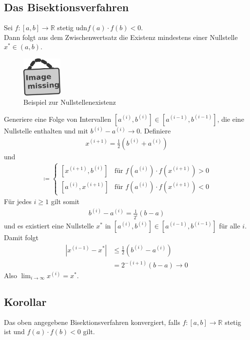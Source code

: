 \documentclass[ngerman,fontsize=11pt, paper=a4, parskip=half, titlepage=true, toc=bib]{scrbook}
\newcommand{\R}{\mathds{R}}
\newcommand{\imagemissing}[1]{
	\begin{figure}
		\centering
		\includegraphics[width=2cm]{images/image_missing.jpg}
		\caption{#1}
	\end{figure}
}
\begin{document}
	  \subsection{Das Bisektionsverfahren}
	  Sei $f:[a,b]\rightarrow \R $ stetig udn$f(a) \cdot f(b) <0$.\\
	  Dann folgt aus dem Zwischenwertsatz die Existenz
	  mindestens einer Nullstelle $x^{*}\in (a,b)$.
	  
	  \imagemissing{Beispiel zur Nullstellenexistenz}
	  
	  Generiere eine Folge von Intervallen
	  $[a^{(i)}, b^{(i)}]\in  [a^{(i-1)}, b^{(i-1)}] $,
	  die eine Nullstelle enthalten und mit $b^{(i)}-a^{(i)} \longrightarrow 0$.
	  Definiere
	  \begin{gather}
	  	x^{(i+1)}= \frac{1}{2}(b^{(i)}+a^{(i)})
	  	\label{V.1.1}
	  \end{gather}
	  und
	  \begin{gather}
	  	[a^{(i+1)}, b^{(i+1)}] \coloneqq \begin{cases}
	  		 [x^{(i+1)}, b^{(i)}] & \text{für } f(a^{(i)})\cdot f(x^{(i+1)}) > 0 \\
	  		 [a^{(i)}, x^{(i+1)}] & \text{für } f(a^{(i)})\cdot f(x^{(i+1)}) < 0
	  	\end{cases}
	  	\label{V.1.2}
	  \end{gather}
	  Für jedes $i\geq 1$ gilt somit
	  \begin{gather*}
	  	b^{(i)}-a^{(i)} = \frac{1}{2^i}(b-a)
	  \end{gather*}
	  und es existiert eine Nullstelle $x^{*}$ in $[a^{(i)}, b^{(i)}]\in  [a^{(i-1)}, b^{(i-1)}] $
	  für alle $i$. \\
	  Damit folgt
	  \begin{align*}
	  	|x^{(i-1)}-x^{*}| &\leq \frac{1}{2}(b^{(i)}-a^{(i)}) \\
	  								&=  2^{-(i+1)} (b-a) \longrightarrow 0
	  \end{align*}
	  Also $\lim_{i\rightarrow \infty}x^{(i)} = x^{*}$.
	  
	  
	\subsection{Korollar}
	Das oben angegebene Bisektionsverfahren konvergiert, falls
	$f:[a,b]\rightarrow \R $ stetig ist und 
	$f(a)\cdot f(b) <0$ gilt.
	
\end{document}
